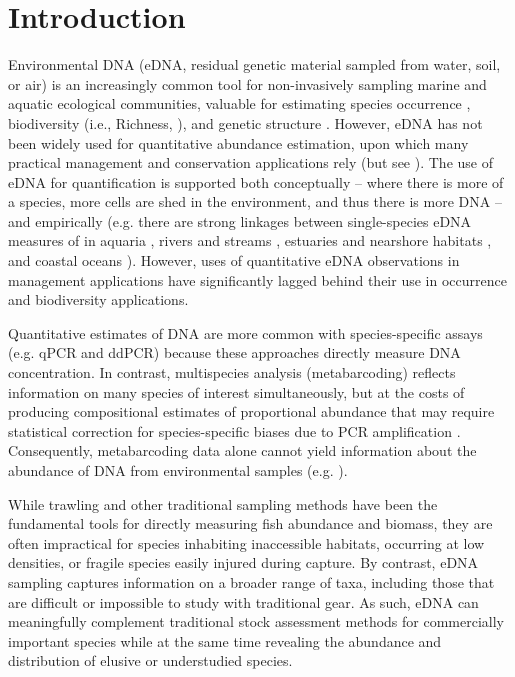 \documentclass{article}
\begin{document}
\section{Introduction}
Environmental DNA (eDNA, residual genetic material sampled from water, soil, or air) is an increasingly common tool for non-invasively sampling marine and aquatic ecological communities, valuable for estimating species occurrence \cite{veilleux2021}, biodiversity (i.e., Richness, \cite{muenzel2024}), and genetic structure \cite{andres2023a}. However, eDNA has not been widely used for quantitative abundance estimation, upon which many practical management and conservation applications rely (but see \cite{shelton2022,guri2024a,stoeckle2022a}). The use of eDNA for quantification is supported both conceptually -- where there is more of a species, more cells are shed in the environment, and thus there is more DNA -- and empirically (e.g. there are strong linkages between single-species eDNA measures of in aquaria \cite{jo2019b,ledger2024}, rivers and streams \cite{pont2024}, estuaries and nearshore habitats \cite{dibattista2022, baetscher2024}, and coastal oceans \cite{maes2023, shelton2019}). However, uses of quantitative eDNA observations in management applications have significantly lagged behind their use in occurrence and biodiversity applications. 

Quantitative estimates of DNA are more common with species-specific assays (e.g. qPCR and ddPCR) because these approaches directly measure DNA concentration. In contrast, multispecies analysis (metabarcoding) reflects information on many species of interest simultaneously, but at the costs of producing compositional estimates of proportional abundance \cite{gloor2017a, mclaren2019} that may require statistical correction for species-specific biases due to PCR amplification \cite{shelton2023}. Consequently, metabarcoding data alone cannot yield information about the abundance of DNA from environmental samples (e.g. \cite{guri2024a}).

While trawling and other traditional sampling methods have been the fundamental tools for directly measuring fish abundance and biomass, they are often impractical for species inhabiting inaccessible habitats, occurring at low densities, or fragile species easily injured during capture. By contrast, eDNA sampling captures information on a broader range of taxa, including those that are difficult or impossible to study with traditional gear. As such, eDNA can meaningfully complement traditional stock assessment methods for commercially important species while at the same time revealing the abundance and distribution of elusive or understudied species.
\end{document}
